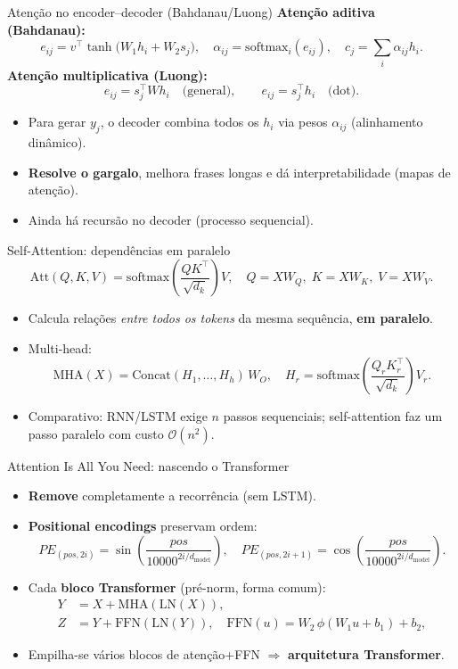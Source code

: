 \documentclass{beamer}
\begin{document}
\begin{frame}{Atenção no encoder--decoder (Bahdanau/Luong)}
\textbf{Atenção aditiva (Bahdanau):}
\[
e_{ij} = v^\top \tanh\!\big(W_1 h_i + W_2 s_j\big),\quad
\alpha_{ij} = \mathrm{softmax}_i(e_{ij}),\quad
c_j = \sum_i \alpha_{ij} h_i .
\]
\textbf{Atenção multiplicativa (Luong):}
\[
e_{ij} = s_j^\top W h_i \quad \text{(general)}, \qquad
e_{ij} = s_j^\top h_i \quad \text{(dot)}.
\]
\begin{itemize}
  \item Para gerar $y_j$, o decoder combina todos os $h_i$ via pesos $\alpha_{ij}$ (alinhamento dinâmico).
  \item \textbf{Resolve o gargalo}, melhora frases longas e dá interpretabilidade (mapas de atenção).
  \item Ainda há recursão no decoder (processo sequencial).
\end{itemize}
\end{frame}

\begin{frame}{Self-Attention: dependências em paralelo}
\[
\mathrm{Att}(Q,K,V)=\mathrm{softmax}\!\left(\frac{QK^\top}{\sqrt{d_k}}\right)V,
\quad
Q = XW_Q,\; K = XW_K,\; V = XW_V.
\]
\begin{itemize}
  \item Calcula relações \emph{entre todos os tokens} da mesma sequência, \textbf{em paralelo}.
  \item Multi-head:
\[
\mathrm{MHA}(X)=\mathrm{Concat}(H_1,\dots,H_h)\,W_O,\quad
H_r=\mathrm{softmax}\!\left(\frac{Q_r K_r^\top}{\sqrt{d_k}}\right)V_r.
\]
  \item Comparativo: RNN/LSTM exige $n$ passos sequenciais; self-attention faz um passo paralelo com custo $\mathcal{O}(n^2)$.
\end{itemize}
\end{frame}

\begin{frame}{Attention Is All You Need: nascendo o Transformer}
\begin{itemize}
  \item \textbf{Remove} completamente a recorrência (sem LSTM).
  \item \textbf{Positional encodings} preservam ordem:
\[
PE_{(pos,2i)}=\sin\!\left(\frac{pos}{10000^{2i/d_{\text{model}}}}\right),\quad
PE_{(pos,2i+1)}=\cos\!\left(\frac{pos}{10000^{2i/d_{\text{model}}}}\right).
\]
  \item Cada \textbf{bloco Transformer} (pré-norm, forma comum):
\[
\begin{aligned}
Y &= X + \mathrm{MHA}(\mathrm{LN}(X)),\\
Z &= Y + \mathrm{FFN}(\mathrm{LN}(Y)),\quad \mathrm{FFN}(u)=W_2\,\phi(W_1u+b_1)+b_2,
\end{aligned}
\]
  \item Empilha-se vários blocos de atenção+FFN $\Rightarrow$ \textbf{arquitetura Transformer}.
\end{itemize}
\end{frame}
\end{document}
